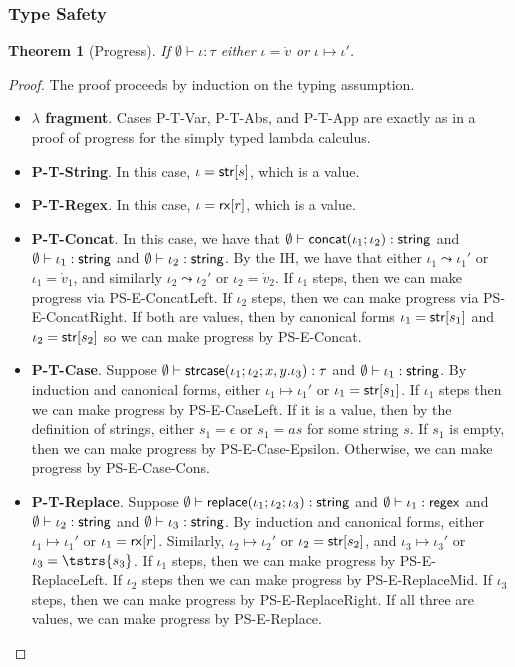 \documentclass[11pt,leqno]{article}
\newtheorem{thm}{Theorem}
\theoremstyle{definition}
\renewcommand{\tstr}[1]{{{\sf str}[#1]}}
\newcommand{\preplace}[3]{{\sf replace}(#1;#2;#3)}
\newcommand{\tconcat}[2]{{\sf concat}(#1;#2)} \newcommand{\concat}[2]{{\sf concat}(#1;#2)} %
\newcommand{\rx}[1]{ {\sf rx}[#1] }
\newcommand{\str}{{\sf string}}
\newcommand{\regex}{{\sf regex}}
\newcommand{\pstrcase}[3]{ {\sf strcase}(#1; #2; #3)}
\begin{document}
\subsubsection{Type Safety}
\begin{thm}[Progress]
If $\emptyset\vdash \iota : \tau$ either $\iota = \dot{v}$ or $\iota \mapsto \iota'$.
\end{thm}
\begin{proof}
The proof proceeds by induction on the typing assumption. 
\begin{itemize}[label=$ $,itemsep=1ex]
\item \textbf{$\lambda$ fragment}. Cases P-T-Var, P-T-Abs, and P-T-App are exactly as in a proof of progress for
the simply typed lambda calculus.

\item \textbf{P-T-String}. In this case, $\iota = \tstr{s}$, which is a value.

\item \textbf{P-T-Regex}. In this case, $\iota = \rx{r}$, which is a value.

\item \textbf{P-T-Concat}. In this case, we have that $\emptyset \vdash \tconcat{\iota_1}{\iota_2} : \str$ and $\emptyset \vdash \iota_1 : \str$ and $\emptyset \vdash \iota_2 : \str$. By the IH, we have that either $\iota_1 \leadsto \iota_1'$ or $\iota_1 = \dot{v}_1$, and similarly $\iota_2 \leadsto \iota_2'$ or $\iota_2 = \dot{v}_2$. If $\iota_1$ steps, then we can make progress via PS-E-ConcatLeft. If $\iota_2$ steps, then we can make progress via PS-E-ConcatRight. If both are values, then by canonical forms $\iota_1 = \tstr{s_1}$ and $\iota_2 = \tstr{s_2}$ so we can make progress by PS-E-Concat.

\item \textbf{P-T-Case}.
Suppose $\emptyset \vdash \pstrcase{\iota_1}{\iota_2}{x,y.\iota_3} : \tau$ and $\emptyset \vdash \iota_1 : \str$. By induction and canonical forms, either $\iota_1 \mapsto \iota_1'$
or $\iota_1 = \tstr{s_1}$. 
If $\iota_1$ steps then we can make progress by PS-E-CaseLeft. If it is a value, then by the definition of strings, either $s_1 = \epsilon$ or $s_1 = as$ for some string $s$. If $s_1$ is empty, then we can make progress by PS-E-Case-Epsilon. Otherwise, we can make progress by PS-E-Case-Cons.

\item \textbf{P-T-Replace}.
Suppose $\emptyset \vdash \preplace{\iota_1}{\iota_2}{\iota_3} : \str$ and $\emptyset \vdash \iota_1 : \regex$ and $\emptyset \vdash \iota_2 : \str$ and $\emptyset \vdash \iota_3 : \str$. By induction and canonical forms, either $\iota_1 \mapsto \iota_1'$ or $\iota_1 = \rx{r}$. Similarly, $\iota_2 \mapsto \iota_2'$ or $\iota_2 = \tstr{s_2}$, and $\iota_3 \mapsto \iota_3'$ or $\iota_3 = \tstrs{s_3}$. If $\iota_1$ steps, then we can make progress by PS-E-ReplaceLeft. If $\iota_2$ steps then we can make progress by PS-E-ReplaceMid. If $\iota_3$ steps, then we can make progress by PS-E-ReplaceRight. If all three are values, we can make progress by PS-E-Replace.


\end{itemize}
\end{proof}
\end{document}
